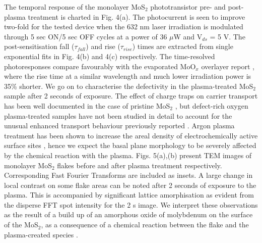 \documentclass[%
 reprint,
superscriptaddress,
 amsmath,amssymb,
 aps,
prb,
]{revtex4-1}
\begin{document}
\indent The temporal response of the monolayer MoS$_2$ phototransistor pre- and post-plasma treatment is charted in Fig. 4(a). The photocurrent is seen to improve two-fold for the tested device when the 632 nm laser irradiation is modulated through 5 sec ON/5 sec OFF cycles at a power of 36 $\mu$W and V$_{ds}$ = 5 V. The post-sensitisation fall ($\tau_{fall}$) and rise ($\tau_{rise}$) times are extracted from single exponential fits in Fig. 4(b) and 4(c) respectively. The time-resolved photoresponses compare favourably with the evaporated MoO$_x$ overlayer report \cite{Yoo2017}, where the rise time at a similar wavelength and much lower irradiation power is 35\% shorter.  \newline
\indent We go on to characterise the defectivity in the plasma-treated MoS$_2$ sample after 2 seconds of exposure.  The effect of charge traps on carrier transport has been well documented in the case of pristine MoS$_2$ \cite{zhu2014electronic, renteria2014low,yu2016realization,kim2017analysis,yuan2017pbti,yu2017analyzing}, but defect-rich oxygen plasma-treated samples have not been studied in detail to account for the unusual enhanced transport behaviour previously reported \cite{nan2017improving,jadwiszczak2017oxide}. Argon plasma treatment has been shown to increase the areal density of electrochemically active surface sites \cite{tao2015plasma}, hence we expect the basal plane morphology to be severely affected by the chemical reaction with the plasma. \newline
\indent Figs. 5(a),(b) present TEM images of monolayer MoS$_2$ flakes before and after plasma treatment respectively. Corresponding Fast Fourier Transforms are included as insets. A large change in local contrast on some flake areas can be noted after 2 seconds of exposure to the plasma. This is accompanied by significant lattice amorphisation as evident from the disperse FFT spot intensity for the 2 s image. We interpret these observations as the result of a build up of an amorphous oxide of molybdenum on the surface of the MoS$_2$, as a consequence of a chemical reaction between the flake and the plasma-created species \cite{ko2016stack, nan2017improving,jadwiszczak2017oxide}.     \newline
\end{document}
